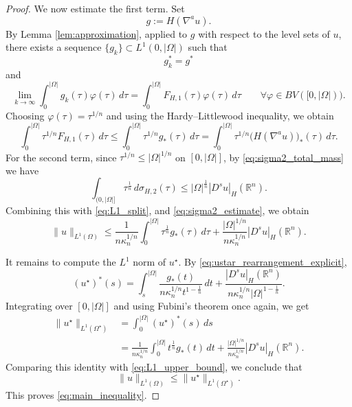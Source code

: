 \documentclass[10pt,a4paper]{amsart}
\begin{document}
\begin{proof}
We now estimate the first term. Set
\[
g:=H(\nabla^a u).
\]
By  Lemma \ref{lem:approximation}, applied to \(g\) with
respect to the level sets of \(u\), there exists a sequence \(\{g_k\}\subset L^1(0,|\Omega|)\)
such that
\[
g_k^*=g^*
\]
and
\[
\lim_{k\to\infty}
\int_0^{|\Omega|} g_k(\tau)\varphi(\tau)\,d\tau
=
\int_0^{|\Omega|}F_{H,1}(\tau)\varphi(\tau)\,d\tau
\qquad
\forall\varphi\in BV([0,|\Omega|)).
\]
Choosing \(\varphi(\tau)=\tau^{1/n}\) and using the Hardy--Littlewood inequality,
we obtain
\[
\int_0^{|\Omega|}\tau^{1/n}F_{H,1}(\tau)\,d\tau
\le
\int_0^{|\Omega|}\tau^{1/n}g_*(\tau)\,d\tau
=
\int_0^{|\Omega|}\tau^{1/n}\big(H(\nabla^a u)\big)_*(\tau)\,d\tau .
\]
For the second term, since $\tau^{1/n}\le |\Omega|^{1/n}$ on $[0,|\Omega|]$, by
\eqref{eq:sigma2_total_mass} we have
\begin{equation}\label{eq:sigma2_estimate}
\int_{(0,|\Omega|]}\tau^{\frac1n}\,d\sigma_{H,2}(\tau)
\le
|\Omega|^{\frac1n}|D^s u|_H(\mathbb{R}^n).
\end{equation}
Combining this with \eqref{eq:L1_split}, and \eqref{eq:sigma2_estimate},
we obtain
\begin{equation}\label{eq:L1_upper_bound}
\|u\|_{L^1(\Omega)}
\le
\frac1{n\kappa_n^{1/n}}
\int_0^{|\Omega|}\tau^{\frac1n} g_*(\tau)\,d\tau
+
\frac{|\Omega|^{1/n}}{n\kappa_n^{1/n}}|D^s u|_H(\mathbb{R}^n).
\end{equation}

It remains to compute the $L^1$ norm of $u^\star$. By
\eqref{eq:ustar_rearrangement_explicit},
\[
(u^\star)^*(s)
=
\int_s^{|\Omega|}
\frac{g_*(t)}{n\kappa_n^{1/n}t^{1-\frac1n}}\,dt
+
\frac{|D^s u|_H(\mathbb{R}^n)}{n\kappa_n^{1/n}|\Omega|^{1-\frac1n}}.
\]
Integrating over $[0,|\Omega|]$ and using Fubini's theorem once again, we get
\begin{align*}
\|u^\star\|_{L^1(\Omega^\star)}
&=
\int_0^{|\Omega|}(u^\star)^*(s)\,ds \\
&=
\frac1{n\kappa_n^{1/n}}
\int_0^{|\Omega|} t^{\frac1n} g_*(t)\,dt
+
\frac{|\Omega|^{1/n}}{n\kappa_n^{1/n}}|D^s u|_H(\mathbb{R}^n).
\end{align*}
Comparing this identity with \eqref{eq:L1_upper_bound}, we conclude that
\[
\|u\|_{L^1(\Omega)}\le \|u^\star\|_{L^1(\Omega^\star)}.
\]
This proves \eqref{eq:main_inequality}.
\end{proof}
\end{document}
